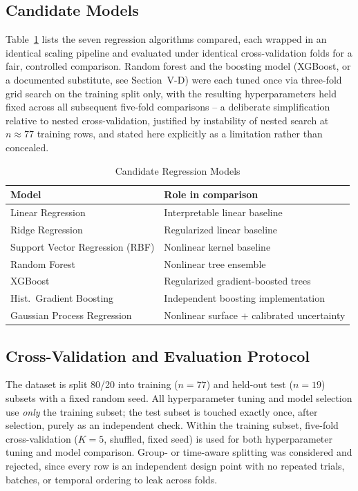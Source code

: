 \documentclass[conference]{IEEEtran}
\begin{document}
\subsection{Candidate Models}
Table~\ref{tab:models} lists the seven regression algorithms compared, each wrapped in an identical scaling pipeline and evaluated under identical cross-validation folds for a fair, controlled comparison. Random forest and the boosting model (XGBoost, or a documented substitute, see Section~V-D) were each tuned once via three-fold grid search on the training split only, with the resulting hyperparameters held fixed across all subsequent five-fold comparisons -- a deliberate simplification relative to nested cross-validation, justified by instability of nested search at $n\approx77$ training rows, and stated here explicitly as a limitation rather than concealed.

\begin{table}[!t]
\caption{Candidate Regression Models}
\label{tab:models}
\centering
\begin{tabular}{@{}ll@{}}
\toprule
\textbf{Model} & \textbf{Role in comparison} \\
\midrule
Linear Regression & Interpretable linear baseline \\
Ridge Regression & Regularized linear baseline \\
Support Vector Regression (RBF) & Nonlinear kernel baseline \\
Random Forest \cite{breiman2001} & Nonlinear tree ensemble \\
XGBoost \cite{chen2016} & Regularized gradient-boosted trees \\
Hist.\ Gradient Boosting & Independent boosting implementation \\
Gaussian Process Regression \cite{rasmussen2006} & Nonlinear surface + calibrated uncertainty \\
\bottomrule
\end{tabular}
\end{table}

\subsection{Cross-Validation and Evaluation Protocol}
The dataset is split 80/20 into training ($n=77$) and held-out test ($n=19$) subsets with a fixed random seed. All hyperparameter tuning and model selection use \emph{only} the training subset; the test subset is touched exactly once, after selection, purely as an independent check. Within the training subset, five-fold cross-validation ($K=5$, shuffled, fixed seed) is used for both hyperparameter tuning and model comparison. Group- or time-aware splitting was considered and rejected, since every row is an independent design point with no repeated trials, batches, or temporal ordering to leak across folds.
\end{document}
